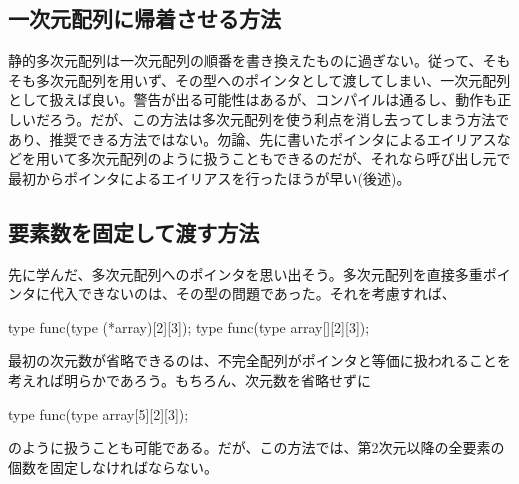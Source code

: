 \subsection{一次元配列に帰着させる方法}
静的多次元配列は一次元配列の順番を書き換えたものに過ぎない。従って、そもそも多次元配列を用いず、その型へのポインタとして渡してしまい、一次元配列として扱えば良い。警告が出る可能性はあるが、コンパイルは通るし、動作も正しいだろう。だが、この方法は多次元配列を使う利点を消し去ってしまう方法であり、推奨できる方法ではない。勿論、先に書いたポインタによるエイリアスなどを用いて多次元配列のように扱うこともできるのだが、それなら呼び出し元で最初からポインタによるエイリアスを行ったほうが早い(後述)。

\subsection{要素数を固定して渡す方法}
先に学んだ、多次元配列へのポインタを思い出そう。多次元配列を直接多重ポインタに代入できないのは、その型の問題であった。それを考慮すれば、
\begin{code}
type func(type (*array)[2][3]);
type func(type array[][2][3]);
\end{code}
最初の次元数が省略できるのは、不完全配列がポインタと等価に扱われることを考えれば明らかであろう。もちろん、次元数を省略せずに
\begin{code}
type func(type array[5][2][3]);
\end{code}
のように扱うことも可能である。だが、この方法では、第2次元以降の全要素の個数を固定しなければならない。

